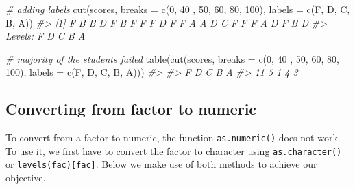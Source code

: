 \documentclass[
]{book}
\newenvironment{Shaded}{\begin{snugshade}}{\end{snugshade}}
\newcommand{\AttributeTok}[1]{\textcolor[rgb]{0.77,0.63,0.00}{#1}}
\newcommand{\CommentTok}[1]{\textcolor[rgb]{0.56,0.35,0.01}{\textit{#1}}}
\newcommand{\DecValTok}[1]{\textcolor[rgb]{0.00,0.00,0.81}{#1}}
\newcommand{\FunctionTok}[1]{\textcolor[rgb]{0.00,0.00,0.00}{#1}}
\newcommand{\NormalTok}[1]{#1}
\newcommand{\StringTok}[1]{\textcolor[rgb]{0.31,0.60,0.02}{#1}}
\begin{document}
\begin{Shaded}
\begin{Highlighting}[]
\CommentTok{\# adding labels}
\FunctionTok{cut}\NormalTok{(scores, }\AttributeTok{breaks =} \FunctionTok{c}\NormalTok{(}\DecValTok{0}\NormalTok{, }\DecValTok{40}\NormalTok{ , }\DecValTok{50}\NormalTok{, }\DecValTok{60}\NormalTok{, }\DecValTok{80}\NormalTok{, }\DecValTok{100}\NormalTok{), }\AttributeTok{labels =} \FunctionTok{c}\NormalTok{(}\StringTok{\textquotesingle{}F\textquotesingle{}}\NormalTok{, }\StringTok{\textquotesingle{}D\textquotesingle{}}\NormalTok{, }\StringTok{\textquotesingle{}C\textquotesingle{}}\NormalTok{, }\StringTok{\textquotesingle{}B\textquotesingle{}}\NormalTok{, }\StringTok{\textquotesingle{}A\textquotesingle{}}\NormalTok{))}
\CommentTok{\#\textgreater{}  [1] F B B D F B F F F D F F A A D C F F F A D F B D}
\CommentTok{\#\textgreater{} Levels: F D C B A}

\CommentTok{\# majority of the students failed}
\FunctionTok{table}\NormalTok{(}\FunctionTok{cut}\NormalTok{(scores, }\AttributeTok{breaks =} \FunctionTok{c}\NormalTok{(}\DecValTok{0}\NormalTok{, }\DecValTok{40}\NormalTok{ , }\DecValTok{50}\NormalTok{, }\DecValTok{60}\NormalTok{, }\DecValTok{80}\NormalTok{, }\DecValTok{100}\NormalTok{), }\AttributeTok{labels =} \FunctionTok{c}\NormalTok{(}\StringTok{\textquotesingle{}F\textquotesingle{}}\NormalTok{, }\StringTok{\textquotesingle{}D\textquotesingle{}}\NormalTok{, }\StringTok{\textquotesingle{}C\textquotesingle{}}\NormalTok{, }\StringTok{\textquotesingle{}B\textquotesingle{}}\NormalTok{, }\StringTok{\textquotesingle{}A\textquotesingle{}}\NormalTok{)))}
\CommentTok{\#\textgreater{} }
\CommentTok{\#\textgreater{}  F  D  C  B  A }
\CommentTok{\#\textgreater{} 11  5  1  4  3}
\end{Highlighting}
\end{Shaded}

\hypertarget{converting-from-factor-to-numeric}{%
\subsection{Converting from factor to numeric}\label{converting-from-factor-to-numeric}}

To convert from a factor to numeric, the function \texttt{as.numeric()} does not work. To use it, we first have to convert the factor to character using \texttt{as.character()} or \texttt{levels(fac){[}fac{]}}. Below we make use of both methods to achieve our objective.
\end{document}
